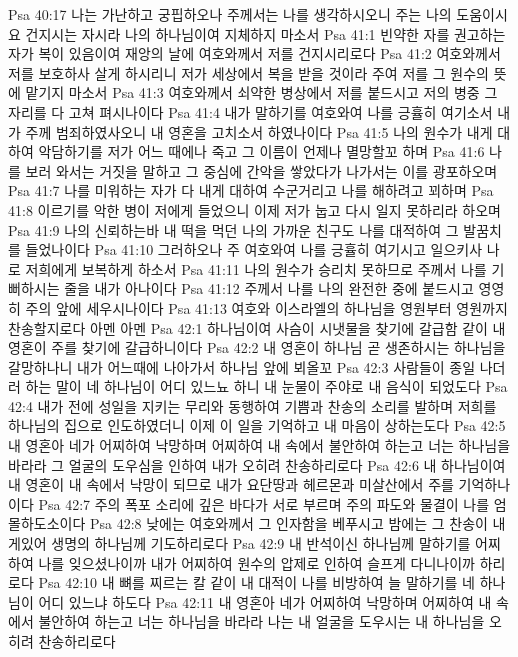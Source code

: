 Psa 40:17  나는 가난하고 궁핍하오나 주께서는 나를 생각하시오니 주는 나의 도움이시요 건지시는 자시라 나의 하나님이여 지체하지 마소서
Psa 41:1  빈약한 자를 권고하는 자가 복이 있음이여 재앙의 날에 여호와께서 저를 건지시리로다
Psa 41:2  여호와께서 저를 보호하사 살게 하시리니 저가 세상에서 복을 받을 것이라 주여 저를 그 원수의 뜻에 맡기지 마소서
Psa 41:3  여호와께서 쇠약한 병상에서 저를 붙드시고 저의 병중 그 자리를 다 고쳐 펴시나이다
Psa 41:4  내가 말하기를 여호와여 나를 긍휼히 여기소서 내가 주께 범죄하였사오니 내 영혼을 고치소서 하였나이다
Psa 41:5  나의 원수가 내게 대하여 악담하기를 저가 어느 때에나 죽고 그 이름이 언제나 멸망할꼬 하며
Psa 41:6  나를 보러 와서는 거짓을 말하고 그 중심에 간악을 쌓았다가 나가서는 이를 광포하오며
Psa 41:7  나를 미워하는 자가 다 내게 대하여 수군거리고 나를 해하려고 꾀하며
Psa 41:8  이르기를 악한 병이 저에게 들었으니 이제 저가 눕고 다시 일지 못하리라 하오며
Psa 41:9  나의 신뢰하는바 내 떡을 먹던 나의 가까운 친구도 나를 대적하여 그 발꿈치를 들었나이다
Psa 41:10  그러하오나 주 여호와여 나를 긍휼히 여기시고 일으키사 나로 저희에게 보복하게 하소서
Psa 41:11  나의 원수가 승리치 못하므로 주께서 나를 기뻐하시는 줄을 내가 아나이다
Psa 41:12  주께서 나를 나의 완전한 중에 붙드시고 영영히 주의 앞에 세우시나이다
Psa 41:13  여호와 이스라엘의 하나님을 영원부터 영원까지 찬송할지로다 아멘 아멘
Psa 42:1  하나님이여 사슴이 시냇물을 찾기에 갈급함 같이 내 영혼이 주를 찾기에 갈급하니이다
Psa 42:2  내 영혼이 하나님 곧 생존하시는 하나님을 갈망하나니 내가 어느때에 나아가서 하나님 앞에 뵈올꼬
Psa 42:3  사람들이 종일 나더러 하는 말이 네 하나님이 어디 있느뇨 하니 내 눈물이 주야로 내 음식이 되었도다
Psa 42:4  내가 전에 성일을 지키는 무리와 동행하여 기쁨과 찬송의 소리를 발하며 저희를 하나님의 집으로 인도하였더니 이제 이 일을 기억하고 내 마음이 상하는도다
Psa 42:5  내 영혼아 네가 어찌하여 낙망하며 어찌하여 내 속에서 불안하여 하는고 너는 하나님을 바라라 그 얼굴의 도우심을 인하여 내가 오히려 찬송하리로다
Psa 42:6  내 하나님이여 내 영혼이 내 속에서 낙망이 되므로 내가 요단땅과 헤르몬과 미살산에서 주를 기억하나이다
Psa 42:7  주의 폭포 소리에 깊은 바다가 서로 부르며 주의 파도와 물결이 나를 엄몰하도소이다
Psa 42:8  낮에는 여호와께서 그 인자함을 베푸시고 밤에는 그 찬송이 내게있어 생명의 하나님께 기도하리로다
Psa 42:9  내 반석이신 하나님께 말하기를 어찌하여 나를 잊으셨나이까 내가 어찌하여 원수의 압제로 인하여 슬프게 다니나이까 하리로다
Psa 42:10  내 뼈를 찌르는 칼 같이 내 대적이 나를 비방하여 늘 말하기를 네 하나님이 어디 있느냐 하도다
Psa 42:11  내 영혼아 네가 어찌하여 낙망하며 어찌하여 내 속에서 불안하여 하는고 너는 하나님을 바라라 나는 내 얼굴을 도우시는 내 하나님을 오히려 찬송하리로다
